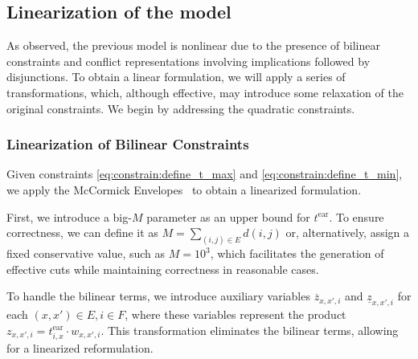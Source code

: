 \documentclass[../../thesis.tex]{subfiles}
\begin{document}
\subsection{Linearization of the model}\label{chap:linearization}

As observed, the previous model is nonlinear due to the presence of bilinear constraints and conflict representations involving implications followed by disjunctions. 
To obtain a linear formulation, we will apply a series of transformations, which, although effective, may introduce some relaxation of the original constraints. 
We begin by addressing the quadratic constraints.

\subsubsection{Linearization of Bilinear Constraints}
\label{sec:linearization:times}

Given constraints \eqref{eq:constrain:define_t_max} and \eqref{eq:constrain:define_t_min}, we apply the McCormick Envelopes~\cite{mccormick-1976} to obtain a linearized formulation.

First, we introduce a big-$M$ parameter as an upper bound for $t^\text{ear}$. To ensure correctness, we can define it as $M = \sum_{(i,j) \in E} d(i,j)$ or, alternatively, assign a fixed conservative value, such as $M = 10^3$, which facilitates the generation of effective cuts while maintaining correctness in reasonable cases.

To handle the bilinear terms, we introduce auxiliary variables $\overline{z}_{x,x',i}$ and $\underline{z}_{x,x',i}$ for each $(x,x') \in E, i \in F$, where these variables represent the product $z_{x,x',i} = t^\text{ear}_{i,x} \cdot w_{x,x',i}$. This transformation eliminates the bilinear terms, allowing for a linearized reformulation.
\end{document}
